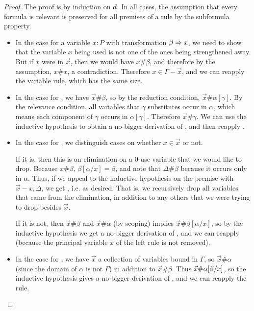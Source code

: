 \begin{proof}
The proof is by induction on $d$.  In all cases, the assumption that
every formula is relevant is preserved for all premises of a rule by the
subformula property.

\begin{itemize}
\item In the case for a variable $x:P$ with transformation $\beta \Rightarrow
  x$, we need to show that the variable $x$ being used is not one of the
  ones being strengthened away.  But if $x$ were in $\vec{x}$, then we
  would have $x \# \beta$, and therefore by the assumption, $x \# x$, a
  contradiction.  Therefore $x \in {\Gamma-\vec{x}}$, and we can reapply
  the variable rule, which has the same size.

\item In the case for \FR, we have $\vec{x} \# \beta$, so by the
  reduction condition, $\vec{x} \# \alpha[\gamma]$.  By the relevance
  condition, all variables that $\gamma$ substitutes occur in $\alpha$,
  which means each component of $\gamma$ occurs in $\alpha[\gamma]$.
  Therefore $\vec{x} \# \gamma$.  We can use the inductive hypothesis to
  obtain a no-bigger derivation of ,
  and then reapply \FR.

\item In the case for \FL, we distinguish cases on whether $x \in
  \vec{x}$ or not.

  If it is, then this is an elimination on a 0-use variable that we
  would like to drop.  Because $x \# \beta$, $\beta[\alpha/x] = \beta$,
  and note that $\Delta \# \beta$ because it occurs only in $\alpha$.
  Thus, if we appeal to the inductive hypothesis on the premise with
  $\vec{x}-x,\Delta$, we get
  , 
  i.e.
  as desired.  That is, we recursively drop all variables that came from
  the elimination, in addition to any others that we were trying to drop
  besides $\vec{x}$.  

  If it is not, then $\vec{x} \# \beta$ and $\vec{x} \# \alpha$ (by
  scoping) implies $\vec{x} \# \beta[\alpha/x]$, so by the inductive
  hypothesis we get a no-bigger derivation of
  , and we can
  reapply \FL (because the principal variable $x$ of the left rule is
  not removed).

\item In the case for \UR, we have $\vec{x}$ a collection of variables
  bound in $\Gamma$, so $\vec{x} \# \alpha$ (since the domain of
  $\alpha$ is not $\Gamma$) in addition to $\vec{x} \# \beta$.  Thus
  $\vec{x} \# \alpha[\beta/x]$, so the inductive hypothesis gives a
  no-bigger derivation of
  , and we can reapply
  the rule.


\end{itemize}
\end{proof}
